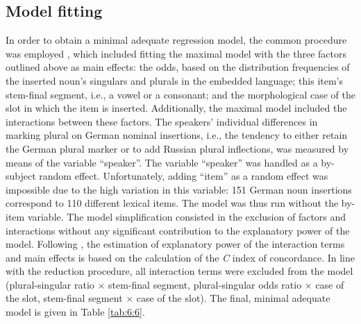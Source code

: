 \subsection{Model fitting}

In order to obtain a minimal adequate regression model, the common procedure was employed \citep{baayen-analyzing,szmrecsanyi-2013}, which included fitting the maximal model with the three factors outlined above as main effects: the odds, based on the distribution frequencies of the inserted noun's singulars and plurals in the embedded language; this item’s stem-final segment, i.e., a vowel or a consonant; and the morphological case of the slot in which the item is inserted. Additionally, the maximal model included the interactions between these factors. The speakers' individual differences in marking plural on German nominal insertions, i.e., the tendency to either retain the German plural marker or to add Russian plural inflections, was measured by means of the variable “speaker”. The variable “speaker” was handled as a by-subject random effect. Unfortunately, adding “item” as a random effect was impossible due to the high variation in this variable: 151 German noun insertions correspond to 110 different lexical items. The model was thus run without the by-item variable. The model simplification consisted in the exclusion of factors and interactions without any significant contribution to the explanatory power of the model. Following \cite[281]{baayen-analyzing}, the estimation of explanatory power of the interaction terms and main effects is based on the calculation of the \textit{C} index of concordance. In line with the reduction procedure, all interaction terms were excluded from the model (plural-singular ratio \(\times\) stem-final segment, plural-singular odds ratio \(\times\) case of the slot, stem-final segment \(\times\) case of the slot). The final, minimal adequate model is given in Table \ref{tab:6:6}.

